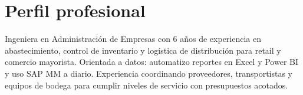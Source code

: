 \documentclass[11pt,a4paper,sans]{moderncv}
\begin{document}
\makecvtitle


\section{Perfil profesional}
\vspace{1pt}
\small{Ingeniera en Administración de Empresas con 6 años de experiencia en abastecimiento, control de inventario y logística de distribución para retail y comercio mayorista. Orientada a datos: automatizo reportes en Excel y Power BI y uso SAP MM a diario. Experiencia coordinando proveedores, transportistas y equipos de bodega para cumplir niveles de servicio con presupuestos acotados.}

\end{document}
